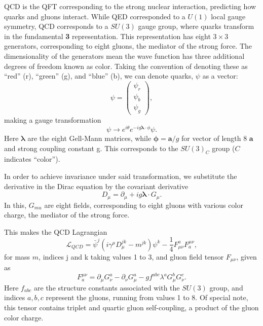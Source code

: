         \gls{QCD} is the \gls{QFT} corresponding to the strong nuclear interaction, predicting how quarks and gluons interact. While \gls{QED} corresponded to a $U(1)$ local gauge symmetry, \gls{QCD} corresponds to a $SU(3)$ gauge group, where quarks transform in the fundamental {\bf 3} representation. This representation has eight $3 \times 3$ generators, corresponding to eight gluons, the mediator of the strong force. The dimensionality of the generators mean the wave function has three additional degrees of freedom known as color. Taking the convention of denoting these as ``red'' (r), ``green'' (g), and ``blue'' (b), we can denote quarks, $\psi$ as a vector:
        \begin{equation}
            \psi =\begin{pmatrix} \psi_{r} \\ \psi_{b} \\ \psi_{g}\end{pmatrix},
        \end{equation}
        making a gauge transformation
        \begin{equation}
        \psi \rightarrow e^{i\theta}e^{-ig {\boldsymbol \lambda\cdot \phi}}\psi.
        \end{equation}
        Here $\boldsymbol \lambda$ are the eight Gell-Mann matrices, while ${\boldsymbol \phi} = {\boldsymbol a}/g$ for vector of length 8 $\boldsymbol a$ and strong coupling constant g. This corresponds to the $SU(3)_C$ group ($C$ indicates ``color'').

        In order to achieve invariance under said transformation, we substitute the derivative in the Dirac equation by the covariant derivative 
        \begin{equation}
            D_{\mu} = \partial_{\mu} + ig {\boldsymbol \lambda\cdot G_{\mu}}.
        \end{equation}
        In this, ${G_{mu}}$ are eight fields, corresponding to eight gluons with various color charge, the mediator of the strong force.

        This makes the \gls{QCD} Lagrangian
        \begin{equation}
            \mathcal{L}_{QCD} = \bar{\psi}^j (i \gamma^{\mu} D_{\mu}^{jk} - m^{jk})\psi^{k} - \frac{1}{4} F_{\mu \nu}^{a} F^{\mu \nu}_{a},
        \end{equation}
        for mass $m$, indices j and k taking values 1 to 3, and gluon field tensor $F_{\mu \nu}$, given as
        \begin{equation}
            F^{\mu \nu}_{a} = \partial_{\mu} G_{\nu}^a - \partial_{\nu}G_{\mu}^a - g f^{abc} \lambda^a G_{\mu}^b G_{\nu}^c.
        \end{equation}
        Here $f_{abc}$ are the structure constants associated with the $SU(3)$ group, and indices $a,b,c$ represent the gluons, running from values 1 to 8. Of special note, this tensor contains triplet and quartic gluon self-coupling, a product of the gluon color charge.


